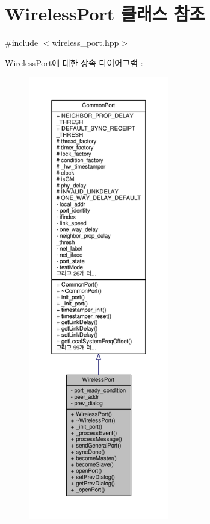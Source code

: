 \hypertarget{class_wireless_port}{}\section{Wireless\+Port 클래스 참조}
\label{class_wireless_port}


{\ttfamily \#include $<$wireless\+\_\+port.\+hpp$>$}



Wireless\+Port에 대한 상속 다이어그램 \+: 
\nopagebreak
\begin{figure}[H]
\begin{center}
\leavevmode
\includegraphics[height=550pt]{class_wireless_port__inherit__graph}
\end{center}
\end{figure}


